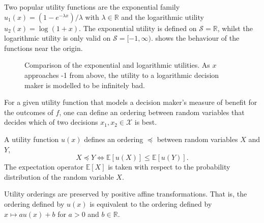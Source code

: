 \documentclass[main.tex]{subfiles}
\begin{document}
\begin{example}
  Two popular utility functions are the exponential family
  $u_1(x)=(1-e^{-\lambda x})/\lambda$ with $\lambda\in\mathbb{R}$ and the logarithmic
  utility $u_2(x)=\log(1+x)$.
  The exponential utility is defined on $\mathcal{S} =\mathbb{R}$,
  whilst the logarithmic utility is only valid on
  $\mathcal{S}=[-1,\infty)$.
   shows the behaviour of the functions
  near the origin.
  \begin{figure}[htbp]
    \centering
    \caption[Comparison of the exponential and logarithmic utilities]{Comparison of the exponential and logarithmic
      utilities. As $x$ approaches -1 from above, the utility to a logarithmic
      decision maker is modelled to be infinitely bad.
    }\label{fig:example_utilities}
  \end{figure}
\end{example}

For a given utility function that models a decision maker's measure of
benefit for the outcomes of $f$, one can define an ordering
between random variables that decides which of two decisions
$x_1,x_2\in\mathcal{X}$ is best.
\begin{mydef}
  A utility function $u(x)$ defines an ordering $\preceq$ between random
  variables $X$ and $Y$,
  \begin{equation}
    X\preceq Y \Leftrightarrow \mathbb{E}[u(X)] \leq \mathbb{E}[u(Y)].
  \end{equation}
  The expectation operator $\mathbb{E}[X]$ is taken with respect to the
  probability distribution of the random variable $X$.
\end{mydef}

\begin{remark}
  Utility orderings are preserved by positive affine transformations.
  That is, the ordering defined by $u(x)$ is equivalent to the
  ordering defined by $x\mapsto au(x)+b$ for  $a>0$ and $b\in\mathbb{R}$.
\end{remark}
\end{document}
